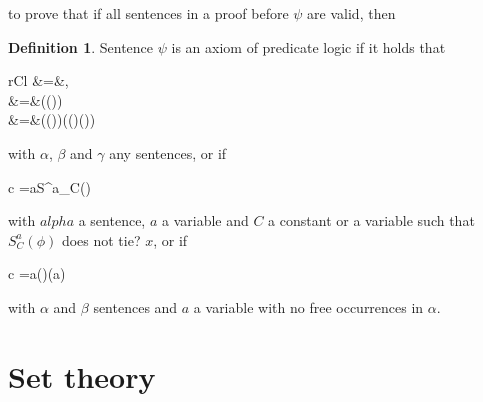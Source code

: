 \documentclass[11pt,oneside,%
]{memoir}
\newenvironment{eqna}{\begin{IEEEeqnarray}{c}}{\end{IEEEeqnarray}\ignorespacesafterend}
\newenvironment{eqnb}{\begin{IEEEeqnarray}{rCl}}{\end{IEEEeqnarray}\ignorespacesafterend}
\theoremstyle{definition}
\newtheorem{maaritelma}{Definition}
\begin{document}




 to prove that if all sentences in a proof before \(\psi\) are valid, then 






 









\begin{maaritelma}
Sentence \(\psi\) is an axiom of predicate logic if it holds that
\begin{eqnb}
    \psi&=&\neg\neg\alpha\rightarrow\alpha,\nonumber\\
    \psi&=&(\alpha\rightarrow(\beta\rightarrow\alpha))\quad{}\nonumber\\
    \psi&=&(\alpha\rightarrow(\beta\rightarrow\gamma))\rightarrow((\alpha\rightarrow\beta)\rightarrow(\alpha\rightarrow\gamma))\nonumber
\end{eqnb}
with \(\alpha\), \(\beta\) and \(\gamma\) any sentences, or if
\begin{eqna}
    \psi=\forall a\;\phi\rightarrow S^a_C(\phi)
\end{eqna}
with \(alpha\) a sentence, \(a\) a variable and \(C\) a constant or a variable such that \(S^a_C(\phi)\) does not tie? \(x\), or if
\begin{eqna}
    \psi=\forall a(\alpha\rightarrow\beta)\rightarrow(\alpha\rightarrow\forall a\beta)
\end{eqna}
with \(\alpha\) and \(\beta\) sentences and \(a\) a variable with no free occurrences in \(\alpha\).
\end{maaritelma}


\chapter{Set theory}



\end{document}
